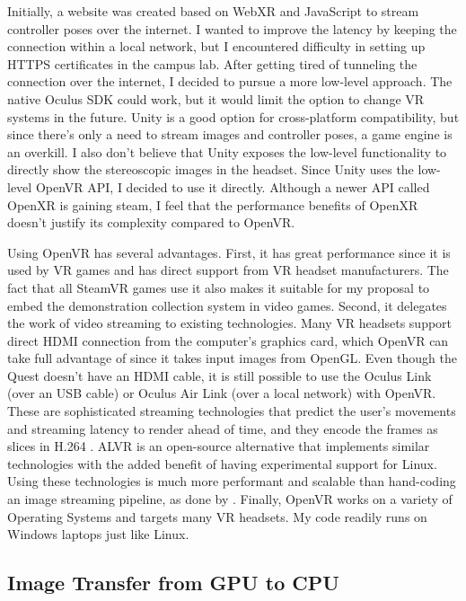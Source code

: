 Initially, a website was created based on WebXR and JavaScript to stream controller poses over the internet. I wanted to improve the latency by keeping the connection within a local network, but I encountered difficulty in setting up HTTPS certificates in the campus lab. After getting tired of tunneling the connection over the internet, I decided to pursue a more low-level approach. 
The native Oculus SDK could work, but it would limit the option to change VR systems in the future. Unity is a good option for cross-platform compatibility, but since there's only a need to stream images and controller poses, a game engine is an overkill. I also don't believe that Unity exposes the low-level functionality to directly show the stereoscopic images in the headset. Since Unity uses the low-level OpenVR API, I decided to use it directly. Although a newer API called OpenXR is gaining steam, I feel that the performance benefits of OpenXR doesn't justify its complexity compared to OpenVR. 

Using OpenVR has several advantages. First, it has great performance since it is used by VR games and has direct support from VR headset manufacturers. The fact that all SteamVR games use it also makes it suitable for my proposal to embed the demonstration collection system in video games. Second, it delegates the work of video streaming to existing technologies. Many VR headsets support direct HDMI connection from the computer's graphics card, which OpenVR can take full advantage of since it takes input images from OpenGL. Even though the Quest doesn't have an HDMI cable, it is still possible to use the Oculus Link (over an USB cable) or Oculus Air Link (over a local network) with OpenVR. These are sophisticated streaming technologies that predict the user's movements and streaming latency to render ahead of time, and they encode the frames as slices in H.264 \cite{air-link}. ALVR is an open-source alternative that implements similar technologies with the added benefit of having experimental support for Linux. Using these technologies is much more performant and scalable than hand-coding an image streaming pipeline, as done by \cite{arunachalam2022holodex}. Finally, OpenVR works on a variety of Operating Systems and targets many VR headsets. My code readily runs on Windows laptops just like Linux.

\subsection{Image Transfer from GPU to CPU}

